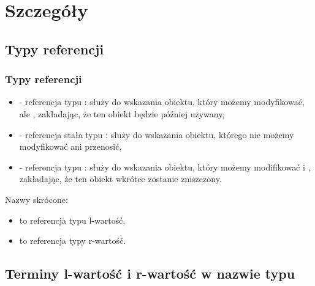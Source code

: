 \documentclass[compress]{beamer}
\begin{document}

\section{Szczegóły}

\subsection{Typy referencji}

\begin{frame}

  \frametitle{Typy referencji}

  \begin{itemize}
  \item {} - referencja typu : służy do
    wskazania obiektu, który możemy modyfikować, ale , zakładając, że ten obiekt będzie później używany,
  \item {} - referencja stała typu :
    służy do wskazania obiektu, którego nie możemy modyfikować ani
    przenosić,
  \item {} - referencja typu : służy do
    wskazania obiektu, który możemy modifikować i ,
    zakładając, że ten obiekt wkrótce zostanie zniszczony.
  \end{itemize}

  \vspace{0.25 cm}

  Nazwy skrócone:
  \begin{itemize}
  \item {} to referencja typu l-wartość,
  \item {} to referencja typy r-wartość.
  \end{itemize}

\end{frame}


\subsection{Terminy l-wartość i r-wartość w nazwie typu}
\end{document}
